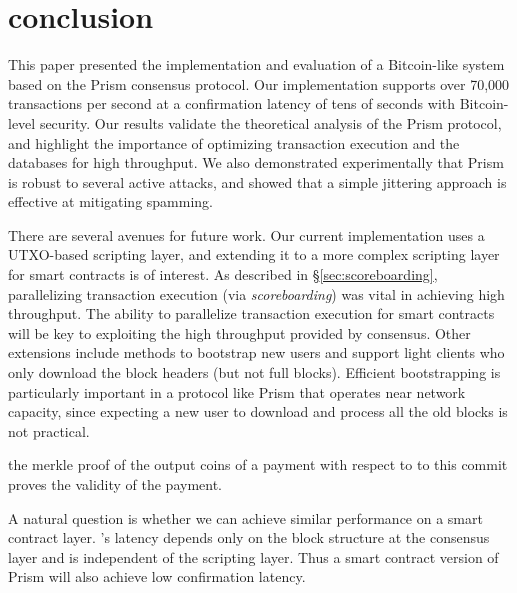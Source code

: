 \section{conclusion}
\label{sec:conclusion}

This paper presented the implementation and evaluation of a Bitcoin-like system based on the Prism consensus protocol. Our implementation supports over 70,000 transactions per second at a confirmation latency of tens of seconds with Bitcoin-level security. Our results validate the theoretical analysis of the Prism protocol, and highlight the importance of optimizing transaction execution and the databases for high throughput.   We also demonstrated experimentally that Prism is robust to several active attacks, and showed that a simple jittering approach is effective at mitigating spamming. 

There are several avenues for future work. Our current implementation uses a UTXO-based scripting layer, and extending it to a more complex scripting layer for smart contracts is of interest.  As described in \S\ref{sec:scoreboarding}, parallelizing transaction execution (via \textit{scoreboarding}) was vital in achieving high throughput. The ability to parallelize transaction execution for smart contracts will  be  key to exploiting the high throughput provided by \prism consensus. Other extensions include methods to bootstrap new users and support light clients who only download the block headers (but not full blocks). Efficient bootstrapping is particularly important in a protocol like Prism that operates near network capacity, since expecting a new user to download and process all the old blocks is not practical. 


the merkle proof of the output coins of a payment with respect to to this commit proves the validity of the payment. 

 A natural question is whether we can achieve similar performance on a smart contract layer. 
 \prism's latency depends only on the block structure at the consensus layer and is independent of the scripting layer. Thus a smart contract version of Prism will also achieve low confirmation latency. 

